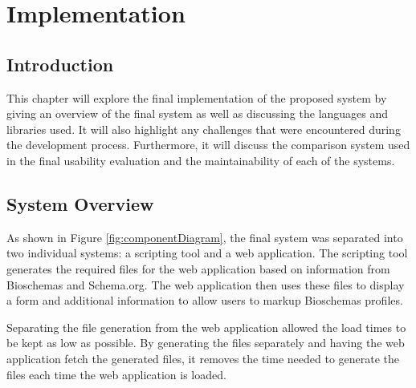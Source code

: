 \chapter{Implementation}

\section{Introduction}
This chapter will explore the final implementation of the proposed system by giving an overview of the final system as well as discussing the languages and libraries used. It will also highlight any challenges that were encountered during the development process. Furthermore, it will discuss the comparison system used in the final usability evaluation and the maintainability of each of the systems.

\section{System Overview}
As shown in Figure \ref{fig:componentDiagram}, the final system was separated into two individual systems: a scripting tool and a web application. The scripting tool generates the required files for the web application based on information from Bioschemas and Schema.org. The web application then uses these files to display a form and additional information to allow users to markup Bioschemas profiles.

Separating the file generation from the web application allowed the load times to be kept as low as possible. By generating the files separately and having the web application fetch the generated files, it removes the time needed to generate the files each time the web application is loaded.


